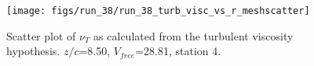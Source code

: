 \begin{figure}[H]
\centering
\texttt{[image: figs/run\_38/run\_38\_turb\_visc\_vs\_r\_meshscatter]}
\caption{Scatter plot of $\nu_T$ as calculated from the turbulent viscosity hypothesis. $z/c$=8.50, $V_{free}$=28.81, station 4.}
\label{fig:run_38_turb_visc_vs_r_meshscatter}
\end{figure}


